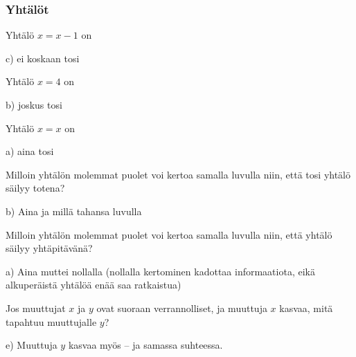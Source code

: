 \subsubsection*{Yhtälöt}
\begin{multicols}{2}

\begin{tehtava}
Yhtälö $x = x-1$ on
\begin{vastaus}
c) ei koskaan tosi
\end{vastaus}
\end{tehtava}

\begin{tehtava}
Yhtälö $x = 4$ on
\begin{vastaus}
b) joskus tosi
\end{vastaus}
\end{tehtava}

\begin{tehtava}
Yhtälö $x = x$ on
\begin{vastaus}
a) aina tosi
\end{vastaus}
\end{tehtava}

\begin{tehtava}
Milloin yhtälön molemmat puolet voi kertoa samalla luvulla niin, että tosi yhtälö säilyy totena?
	\begin{vastaus}
b) Aina ja millä tahansa luvulla
	\end{vastaus}
\end{tehtava}

\begin{tehtava}
Milloin yhtälön molemmat puolet voi kertoa samalla luvulla niin, että yhtälö säilyy yhtäpitävänä?
\begin{vastaus}
a) Aina muttei nollalla (nollalla kertominen kadottaa informaatiota, eikä alkuperäistä yhtälöä enää saa ratkaistua)
\end{vastaus}
\end{tehtava}

\begin{tehtava}
Jos muuttujat $x$ ja $y$ ovat suoraan verrannolliset, ja muuttuja $x$ kasvaa, mitä tapahtuu muuttujalle $y$?
\begin{vastaus}
e) Muuttuja $y$ kasvaa myös -- ja samassa suhteessa.
\end{vastaus}
\end{tehtava}


\end{multicols}
